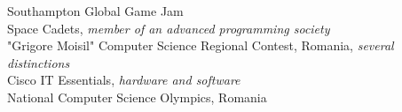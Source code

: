 
\bigskip
{}%
Southampton Global Game Jam\\
Space Cadets, \emph{member of an advanced programming society}\\
"Grigore Moisil" Computer Science Regional Contest, Romania, \emph{several distinctions}\\
Cisco IT Essentials, \emph{hardware and software}\\
National Computer Science Olympics, Romania \\
